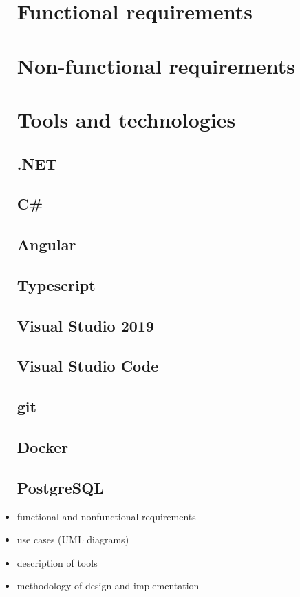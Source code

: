 \documentclass[a4paper,twoside,12pt]{book}
\begin{document}
\begin{itemize}
\section{Functional requirements}
\section{Non-functional requirements}

\section{Tools and technologies}
\subsection{.NET}
\subsection{C\#}
\subsection{Angular}
\subsection{Typescript}
\subsection{Visual Studio 2019}
\subsection{Visual Studio Code}
\subsection{git}
\subsection{Docker}
\subsection{PostgreSQL}









\item functional and nonfunctional requirements
\item use cases (UML diagrams)
\item description of tools
\item methodology of design and implementation
\end{itemize} 
\end{document}
